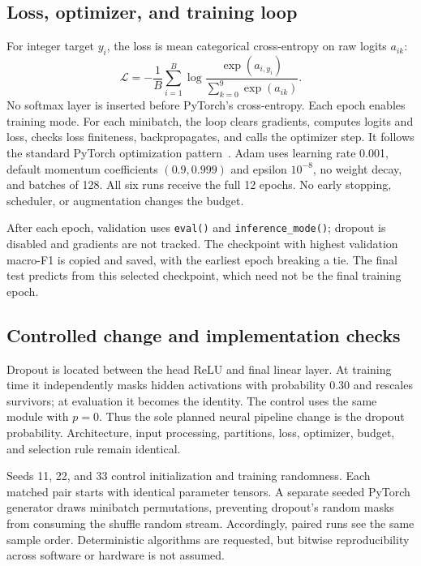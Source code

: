\documentclass[conference]{IEEEtran}
\begin{document}
\subsection{Loss, optimizer, and training loop}
For integer target $y_i$, the loss is mean categorical cross-entropy on raw logits $a_{ik}$:
\begin{equation}
 \mathcal{L}=-\frac{1}{B}\sum_{i=1}^{B}
 \log\frac{\exp(a_{i,y_i})}{\sum_{k=0}^{9}\exp(a_{ik})}.
\end{equation}
No softmax layer is inserted before PyTorch's cross-entropy. Each epoch enables training mode. For each minibatch, the loop clears gradients, computes logits and loss, checks loss finiteness, backpropagates, and calls the optimizer step. It follows the standard PyTorch optimization pattern~\cite{pytorch}. Adam uses learning rate 0.001, default momentum coefficients $(0.9,0.999)$ and epsilon $10^{-8}$, no weight decay, and batches of 128. All six runs receive the full 12 epochs. No early stopping, scheduler, or augmentation changes the budget.

After each epoch, validation uses \texttt{eval()} and \texttt{inference\_mode()}; dropout is disabled and gradients are not tracked. The checkpoint with highest validation macro-F1 is copied and saved, with the earliest epoch breaking a tie. The final test predicts from this selected checkpoint, which need not be the final training epoch.

\subsection{Controlled change and implementation checks}
Dropout is located between the head ReLU and final linear layer. At training time it independently masks hidden activations with probability 0.30 and rescales survivors; at evaluation it becomes the identity. The control uses the same module with $p=0$. Thus the sole planned neural pipeline change is the dropout probability. Architecture, input processing, partitions, loss, optimizer, budget, and selection rule remain identical.

Seeds 11, 22, and 33 control initialization and training randomness. Each matched pair starts with identical parameter tensors. A separate seeded PyTorch generator draws minibatch permutations, preventing dropout's random masks from consuming the shuffle random stream. Accordingly, paired runs see the same sample order. Deterministic algorithms are requested, but bitwise reproducibility across software or hardware is not assumed.
\end{document}
